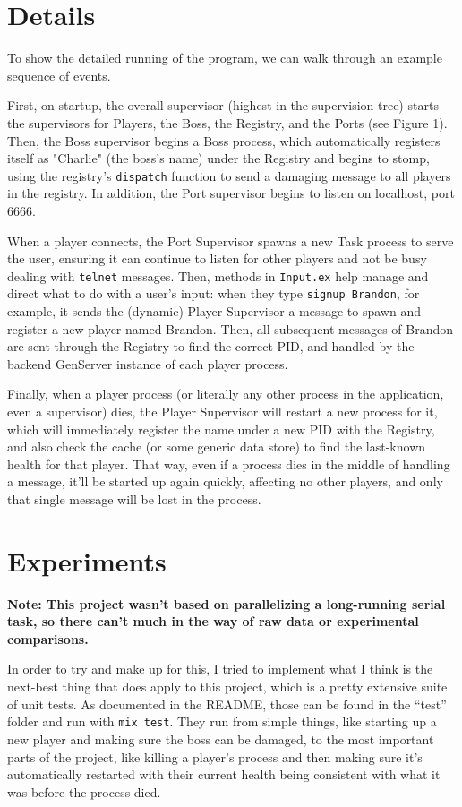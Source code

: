 \documentclass[letterpaper]{article}
\begin{document}
	\section{Details}

	To show the detailed running of the program, we can walk through an example sequence of events.

	First, on startup, the overall supervisor (highest in the supervision tree) starts the supervisors for Players, the Boss, the Registry, and the Ports (see Figure 1). Then, the Boss supervisor begins a Boss process, which automatically registers itself as "Charlie" (the boss's name) under the Registry and begins to stomp, using the registry's \texttt{dispatch} function to send a damaging message to all players in the registry. In addition, the Port supervisor begins to listen on localhost, port 6666. 

	When a player connects, the Port Supervisor spawns a new Task process to serve the user, ensuring it can continue to listen for other players and not be busy dealing with \texttt{telnet} messages. Then, methods in \texttt{Input.ex} help manage and direct what to do with a user's input: when they type \texttt{signup Brandon}, for example, it sends the (dynamic) Player Supervisor a message to spawn and register a new player named Brandon. Then, all subsequent messages of Brandon are sent through the Registry to find the correct PID, and handled by the backend GenServer instance of each player process.

	Finally, when a player process (or literally any other process in the application, even a supervisor) dies, the Player Supervisor will restart a new process for it, which will immediately register the name under a new PID with the Registry, and also check the cache (or some generic data store) to find the last-known health for that player. That way, even if a process dies in the middle of handling a message, it'll be started up again quickly, affecting no other players, and only that single message will be lost in the process.

	\section{Experiments}

	\textbf{Note: This project wasn't based on parallelizing a long-running serial task, so there can't much in the way of raw data or experimental comparisons.}

	In order to try and make up for this, I tried to implement what I think is the next-best thing that does apply to this project, which is a pretty extensive suite of unit tests. As documented in the README, those can be found in the ``test'' folder and run with \texttt{mix test}. They run from simple things, like starting up a new player and making sure the boss can be damaged, to the most important parts of the project, like killing a player's process and then making sure it's automatically restarted with their current health being consistent with what it was before the process died.
\end{document}
